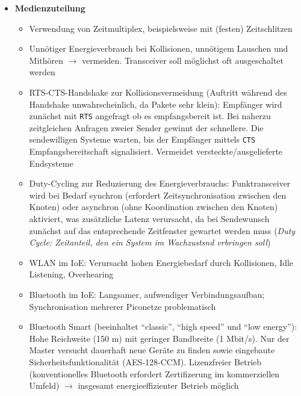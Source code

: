 \begin{itemize}
	\item \textbf{Medienzuteilung}
	\begin{itemize}
		\item Verwendung von Zeitmultiplex, beispielsweise mit (festen) Zeitschlitzen
		\item Unnötiger Energieverbrauch bei Kollisionen, unnötigem Lauschen und Mithören \(\rightarrow\) vermeiden. Transceiver soll möglichst oft ausgeschaltet werden
		\item RTS-CTS-Handshake zur Kollisionsvermeidung (Auftritt während des Handshake unwahrscheinlich, da Pakete sehr klein): Empfänger wird zunächst mit \texttt{RTS} angefragt ob es empfangsbereit ist. Bei naherzu zeitgleichen Anfragen zweier Sender gewinnt der schnellere. Die sendewilligen Systeme warten, bis der Empfänger mittels \texttt{CTS} Empfangsbereitschaft signalisiert. Vermeidet versteckte/ausgelieferte Endsysteme
		\item Duty-Cycling zur Reduzierung des Energieverbrauchs: Funktransceiver wird bei Bedarf synchron (erfordert Zeitsynchronisation zwischen den Knoten) oder asynchron (ohne Koordination zwischen den Knoten) aktiviert, was zusätzliche Latenz verursacht, da bei Sendewunsch zunächst auf das entsprechende Zeitfenster gewartet werden muss (\textit{Duty Cycle: Zeitanteil, den ein System im Wachzustsnd vrbringen soll})
		\item WLAN im IoE: Verursacht hohen Energiebedarf durch Kollisionen, Idle Listening, Overhearing
		\item Bluetooth im IoE: Langsamer, aufwendiger Verbindungsaufbau; Synchronisation mehrerer Piconetze problematisch
		\item Bluetooth Smart (beeinhaltet "`classic"', "`high speed"' und "`low energy"'): Hohe Reichweite (150 m) mit geringer Bandbreite (1 Mbit/s). Nur der Master versucht dauerhaft neue Geräte zu finden sowie eingebaute Sicherheitsfunktionalität (AES-128-CCM). Lizenzfreier Betrieb (konventionelles Bluetooth erfordert Zertifizerung im kommerziellen Umfeld) \(\rightarrow\) insgesamt energieeffizienter Betrieb möglich
	\end{itemize}
\end{itemize}

